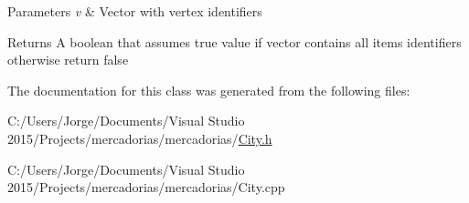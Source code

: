 \begin{DoxyParams}{Parameters}
{\em v} & Vector with vertex identifiers \\
\hline
\end{DoxyParams}
\begin{DoxyReturn}{Returns}
A boolean that assumes true value if vector contains all items identifiers otherwise return false 
\end{DoxyReturn}


The documentation for this class was generated from the following files\+:\begin{DoxyCompactItemize}
\item 
C\+:/\+Users/\+Jorge/\+Documents/\+Visual Studio 2015/\+Projects/mercadorias/mercadorias/\hyperlink{_city_8h}{City.\+h}\item 
C\+:/\+Users/\+Jorge/\+Documents/\+Visual Studio 2015/\+Projects/mercadorias/mercadorias/City.\+cpp\end{DoxyCompactItemize}
